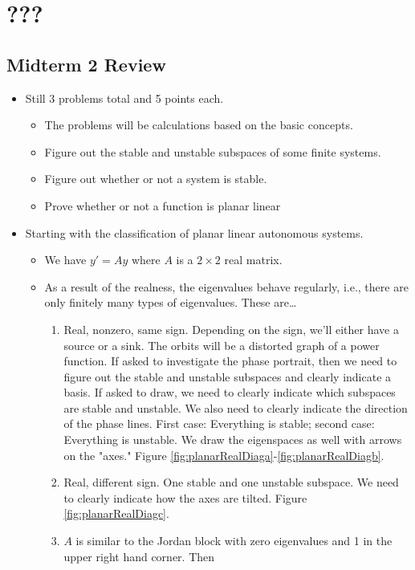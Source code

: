 \documentclass[../notes.tex]{subfiles}
\begin{document}
\chapter{???}
\section{Midterm 2 Review}
\begin{itemize}
    \item {}Still 3 problems total and 5 points each.
    \begin{itemize}
        \item The problems will be calculations based on the basic concepts.
        \item Figure out the stable and unstable subspaces of some finite systems.
        \item Figure out whether or not a system is stable.
        \item Prove whether or not a function is planar linear
    \end{itemize}
    \item Starting with the classification of planar linear autonomous systems.
    \begin{itemize}
        \item We have $y'=Ay$ where $A$ is a $2\times 2$ real matrix.
        \item As a result of the realness, the eigenvalues behave regularly, i.e., there are only finitely many types of eigenvalues. These are\dots
        \begin{enumerate}
            \item Real, nonzero, same sign. Depending on the sign, we'll either have a source or a sink. The orbits will be a distorted graph of a power function. If asked to investigate the phase portrait, then we need to figure out the stable and unstable subspaces and clearly indicate a basis. If asked to draw, we need to clearly indicate which subspaces are stable and unstable. We also need to clearly indicate the direction of the phase lines. First case: Everything is stable; second case: Everything is unstable. We draw the eigenspaces as well with arrows on the "axes." Figure \ref{fig:planarRealDiaga}-\ref{fig:planarRealDiagb}.
            \item Real, different sign. One stable and one unstable subspace. We need to clearly indicate how the axes are tilted. Figure \ref{fig:planarRealDiagc}.
            \item $A$ is similar to the Jordan block with zero eigenvalues and 1 in the upper right hand corner. Then

\end{enumerate}
\end{itemize}
\end{itemize}
\end{document}
